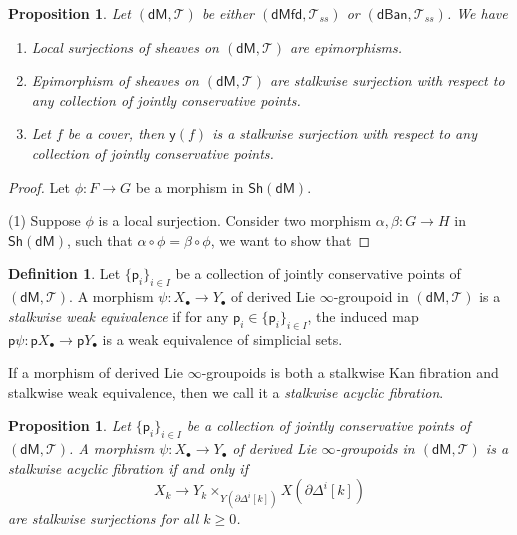 \documentclass[12pt]{amsart}
\newtheorem{prop}[thm]{Proposition}
\theoremstyle{definition}
\newtheorem{defn}[thm]{Definition}
\theoremstyle{remark}
\numberwithin{equation}{section}
\newcommand{\del}{\partial}
\renewcommand{\del}{\partial}
\newcommand{\1}{{\mathbb{1}}}
\newcommand{\y}{\mathsf{y}}
\newcommand{\p}{\mathsf{p}}
\newcommand{\dm}{\mathsf{dM}}
\newcommand{\dmfd}{\mathsf{dMfd}}
\newcommand{\dban}{\mathsf{dBan}}
\newcommand{\sh}{\mathsf{Sh}}
\newcommand{\bt}{\bullet}
\begin{document}
\begin{prop}
Let $(\dm, \mathcal{T})$ be either $(\dmfd, \mathcal{T}_{ss} )$ or $(\dban, \mathcal{T}_{ss} )$.
We have 
\begin{enumerate}
    \item Local surjections of sheaves on $(\dm, \mathcal{T})$ are epimorphisms.
    \item Epimorphism of sheaves on $(\dm, \mathcal{T})$ are stalkwise surjection with respect to any collection of jointly conservative points.
    \item Let $f$ be a cover, then $\y(f)$ is a stalkwise surjection with respect to any collection of jointly conservative points.
\end{enumerate}

\end{prop}

\begin{proof}
Let $\phi: F \to G$ be a morphism in $\sh(\dm)$.

(1) Suppose $\phi$ is a local surjection. Consider two morphism $\alpha, \beta: G\to H$ in $\sh(\dm)$, such that $\alpha\circ \phi = \beta\circ \phi$, we want to show that   
\end{proof}



\begin{defn}
Let $\{\p_i\}_{i\in I}$ be a collection of jointly conservative points of $(\dm, \mathcal{T})$. 
    A morphism $\psi: X_{\bt} \to Y_{\bt}$  of derived Lie $\infty$-groupoid in $(\dm, \mathcal{T})$ is a {\it stalkwise weak equivalence}  if for any $\p_i \in \{\p_i\}_{i\in I}$, the induced map $\p\psi: \p X_{\bt} \to \p Y_{\bt}$ is a weak equivalence of simplicial sets.
\end{defn}
If a morphism of derived Lie $\infty$-groupoids is both a stalkwise Kan fibration and stalkwise weak equivalence, then we call it a {\it stalkwise acyclic fibration}.

\begin{prop}
Let $\{\p_i\}_{i\in I}$ be a collection of jointly conservative points of $(\dm, \mathcal{T})$. A morphism $\psi: X_{\bt} \to Y_{\bt}$  of derived Lie $\infty$-groupoids in $(\dm, \mathcal{T})$ is a stalkwise acyclic fibration if and only if
    $$X_k \to Y_k \times_{Y(\del \Delta^i[k])} X(\del \Delta^i[k])$$
    are stalkwise surjections for all $k\ge 0$.
\end{prop}
\end{document}
